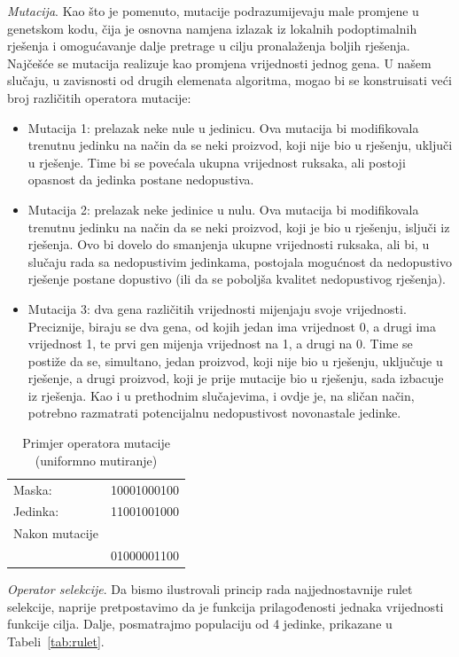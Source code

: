 \documentclass[a4paper, utf8, 11pt, colorlinks]{book}
\theoremstyle{definition}
\begin{document}
\emph{Mutacija}. Kao što je pomenuto, mutacije podrazumijevaju male promjene u genetskom kodu, čija je osnovna namjena izlazak iz lokalnih podoptimalnih rješenja i omogućavanje dalje pretrage u cilju pronalaženja boljih rješenja. Najčešće se mutacija realizuje kao promjena vrijednosti jednog gena. U našem slučaju, u zavisnosti od drugih elemenata algoritma, mogao bi se konstruisati veći broj različitih operatora mutacije: 
\begin{itemize}
	\item Mutacija 1: prelazak neke nule u jedinicu. Ova mutacija bi modifikovala trenutnu jedinku na način da se neki proizvod, koji nije bio u rješenju, uključi u rješenje. Time bi se povećala ukupna vrijednost ruksaka, ali postoji opasnost da jedinka postane nedopustiva.
	\item  Mutacija 2: prelazak neke jedinice u nulu. Ova mutacija bi modifikovala trenutnu jedinku na način da se neki proizvod, koji je bio u rješenju, isljuči iz rješenja. Ovo bi dovelo do smanjenja ukupne vrijednosti ruksaka, ali bi, u slučaju rada sa nedopustivim jedinkama, postojala mogućnost da nedopustivo rješenje postane dopustivo (ili da se poboljša kvalitet nedopustivog rješenja).
	\item  Mutacija 3: dva gena različitih vrijednosti mijenjaju svoje vrijednosti. Preciznije, biraju se dva gena, od kojih jedan ima vrijednost 0, a drugi ima vrijednost 1, te prvi gen mijenja vrijednost na 1, a drugi na 0. Time se postiže da se, simultano, jedan proizvod, koji nije bio u rješenju, uključuje u rješenje, a drugi proizvod, koji je prije mutacije bio u rješenju, sada izbacuje iz rješenja. Kao i u prethodnim slučajevima, i ovdje je, na sličan način, potrebno razmatrati potencijalnu nedopustivost novonastale jedinke.
\end{itemize}

\begin{table}[H]
	\centering
	\begin{tabular}{lc}
		Maska:  & 10001000100  \\
		Jedinka: & 11001001000  \\ \hline
		Nakon mutacije &       \\
		               & 01000001100      \\
	\end{tabular}	
	\caption{Primjer operatora mutacije (uniformno mutiranje)}
\end{table}

\emph{Operator selekcije}. Da bismo ilustrovali princip rada najjednostavnije rulet selekcije, naprije pretpostavimo da je funkcija prilagođenosti jednaka vrijednosti funkcije cilja. Dalje, posmatrajmo populaciju od 4 jedinke, prikazane u Tabeli~\ref{tab:rulet}.
\end{document}

